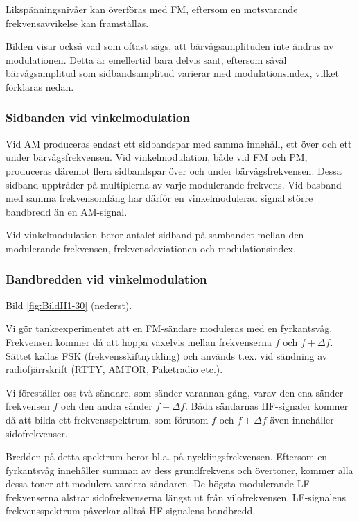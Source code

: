 Likspänningsnivåer kan överföras med FM, eftersom en motsvarande
frekvensavvikelse kan framställas.

Bilden visar också vad som oftast sägs, att bärvågsamplituden inte ändras av
modulationen. Detta är emellertid bara delvis sant, eftersom såväl
bärvågsamplitud som sidbandsamplitud varierar med modulationsindex, vilket
förklaras nedan.

\subsubsection{Sidbanden vid vinkelmodulation}

Vid AM produceras endast ett sidbandspar med samma innehåll, ett över och ett
under bärvågsfrekvensen. Vid vinkelmodulation, både vid FM och PM, produceras
däremot flera sidbandspar över och under bärvågsfrekvensen. Dessa sidband
uppträder på multiplerna av varje modulerande frekvens. Vid basband med samma
frekvensomfång har därför en vinkelmodulerad signal större bandbredd än en
AM-signal.

Vid vinkelmodulation beror antalet sidband på sambandet mellan den modulerande
frekvensen, frekvensdeviationen och modulationsindex.

\subsubsection{Bandbredden vid vinkelmodulation}

Bild \ref{fig:BildII1-30} (nederst).

Vi gör tankeexperimentet att en FM-sändare moduleras med en fyrkantsvåg.
Frekvensen kommer då att hoppa växelvis mellan frekvenserna \(f\) och
\(f + \Delta f\). Sättet kallas FSK (frekvensskiftnyckling) och används t.ex.
vid sändning av radiofjärrskrift (RTTY, AMTOR, Paketradio etc.).

Vi föreställer oss två sändare, som sänder varannan gång, varav den ena sänder
frekvensen \(f\) och den andra sänder \(f + \Delta f\). Båda sändarnas
HF-signaler kommer då att bilda ett frekvensspektrum, som förutom \(f\) och
\(f + \Delta f\) även innehåller sidofrekvenser.

Bredden på detta spektrum beror bl.a. på nycklingsfrekvensen. Eftersom en
fyrkantsvåg innehåller summan av dess grundfrekvens och övertoner, kommer alla
dessa toner att modulera vardera sändaren. De högsta modulerande
LF-frekvenserna alstrar sidofrekvenserna längst ut från vilofrekvensen.
LF-signalens frekvensspektrum påverkar alltså HF-signalens bandbredd.

